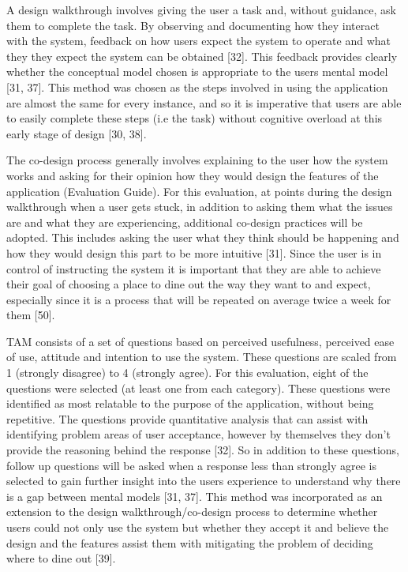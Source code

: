 \documentclass[a4 paper, 12pt]{article}
\begin{document}
A design walkthrough involves giving the user a task and, without guidance, ask them to complete the task. By observing and documenting how they interact with the system, feedback on how users expect the system to operate and what they they expect the system can be obtained [32]. This feedback provides clearly whether the conceptual model chosen is appropriate to the users mental model [31, 37]. This method was chosen as the steps involved in using the application are almost the same for every instance, and so it is imperative that users are able to easily complete these steps (i.e the task) without cognitive overload at this early stage of design [30, 38].

The co-design process generally involves explaining to the user how the system works and asking for their opinion how they would design the features of the application (Evaluation Guide). For this evaluation, at points during the design walkthrough when a user gets stuck, in addition to asking them what the issues are and what they are experiencing, additional co-design practices will be adopted. This includes asking the user what they think should be happening and how they would design this part to be more intuitive [31]. Since the user is in control of instructing the system it is important that they are able to achieve their goal of choosing a place to dine out the way they want to and expect, especially since it is a process that will be repeated on average twice a week for them [50]. 

TAM consists of a set of questions based on perceived usefulness, perceived ease of use, attitude and intention to use the system. These questions are scaled from 1 (strongly disagree) to 4 (strongly agree). For this evaluation, eight of the questions were selected (at least one from each category). These questions were identified as most relatable to the purpose of the application, without being repetitive. The questions provide quantitative analysis that can assist with identifying problem areas of user acceptance, however by themselves they don't provide the reasoning behind the response [32]. So in addition to these questions, follow up questions will be asked when a response less than strongly agree is selected to gain further insight into the users experience to understand why there is a gap between mental models [31, 37]. This method was incorporated as an extension to the design walkthrough/co-design process to determine whether users could not only use the system but whether they accept it and believe the design and the features assist them with mitigating the problem of deciding where to dine out [39].
\end{document}
